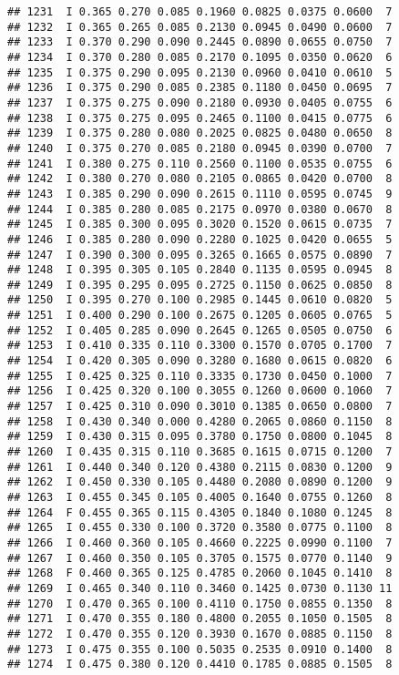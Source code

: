 \documentclass[
]{article}
\begin{document}
\begin{verbatim}
## 1231  I 0.365 0.270 0.085 0.1960 0.0825 0.0375 0.0600  7
## 1232  I 0.365 0.265 0.085 0.2130 0.0945 0.0490 0.0600  7
## 1233  I 0.370 0.290 0.090 0.2445 0.0890 0.0655 0.0750  7
## 1234  I 0.370 0.280 0.085 0.2170 0.1095 0.0350 0.0620  6
## 1235  I 0.375 0.290 0.095 0.2130 0.0960 0.0410 0.0610  5
## 1236  I 0.375 0.290 0.085 0.2385 0.1180 0.0450 0.0695  7
## 1237  I 0.375 0.275 0.090 0.2180 0.0930 0.0405 0.0755  6
## 1238  I 0.375 0.275 0.095 0.2465 0.1100 0.0415 0.0775  6
## 1239  I 0.375 0.280 0.080 0.2025 0.0825 0.0480 0.0650  8
## 1240  I 0.375 0.270 0.085 0.2180 0.0945 0.0390 0.0700  7
## 1241  I 0.380 0.275 0.110 0.2560 0.1100 0.0535 0.0755  6
## 1242  I 0.380 0.270 0.080 0.2105 0.0865 0.0420 0.0700  8
## 1243  I 0.385 0.290 0.090 0.2615 0.1110 0.0595 0.0745  9
## 1244  I 0.385 0.280 0.085 0.2175 0.0970 0.0380 0.0670  8
## 1245  I 0.385 0.300 0.095 0.3020 0.1520 0.0615 0.0735  7
## 1246  I 0.385 0.280 0.090 0.2280 0.1025 0.0420 0.0655  5
## 1247  I 0.390 0.300 0.095 0.3265 0.1665 0.0575 0.0890  7
## 1248  I 0.395 0.305 0.105 0.2840 0.1135 0.0595 0.0945  8
## 1249  I 0.395 0.295 0.095 0.2725 0.1150 0.0625 0.0850  8
## 1250  I 0.395 0.270 0.100 0.2985 0.1445 0.0610 0.0820  5
## 1251  I 0.400 0.290 0.100 0.2675 0.1205 0.0605 0.0765  5
## 1252  I 0.405 0.285 0.090 0.2645 0.1265 0.0505 0.0750  6
## 1253  I 0.410 0.335 0.110 0.3300 0.1570 0.0705 0.1700  7
## 1254  I 0.420 0.305 0.090 0.3280 0.1680 0.0615 0.0820  6
## 1255  I 0.425 0.325 0.110 0.3335 0.1730 0.0450 0.1000  7
## 1256  I 0.425 0.320 0.100 0.3055 0.1260 0.0600 0.1060  7
## 1257  I 0.425 0.310 0.090 0.3010 0.1385 0.0650 0.0800  7
## 1258  I 0.430 0.340 0.000 0.4280 0.2065 0.0860 0.1150  8
## 1259  I 0.430 0.315 0.095 0.3780 0.1750 0.0800 0.1045  8
## 1260  I 0.435 0.315 0.110 0.3685 0.1615 0.0715 0.1200  7
## 1261  I 0.440 0.340 0.120 0.4380 0.2115 0.0830 0.1200  9
## 1262  I 0.450 0.330 0.105 0.4480 0.2080 0.0890 0.1200  9
## 1263  I 0.455 0.345 0.105 0.4005 0.1640 0.0755 0.1260  8
## 1264  F 0.455 0.365 0.115 0.4305 0.1840 0.1080 0.1245  8
## 1265  I 0.455 0.330 0.100 0.3720 0.3580 0.0775 0.1100  8
## 1266  I 0.460 0.360 0.105 0.4660 0.2225 0.0990 0.1100  7
## 1267  I 0.460 0.350 0.105 0.3705 0.1575 0.0770 0.1140  9
## 1268  F 0.460 0.365 0.125 0.4785 0.2060 0.1045 0.1410  8
## 1269  I 0.465 0.340 0.110 0.3460 0.1425 0.0730 0.1130 11
## 1270  I 0.470 0.365 0.100 0.4110 0.1750 0.0855 0.1350  8
## 1271  I 0.470 0.355 0.180 0.4800 0.2055 0.1050 0.1505  8
## 1272  I 0.470 0.355 0.120 0.3930 0.1670 0.0885 0.1150  8
## 1273  I 0.475 0.355 0.100 0.5035 0.2535 0.0910 0.1400  8
## 1274  I 0.475 0.380 0.120 0.4410 0.1785 0.0885 0.1505  8

\end{verbatim}
\end{document}
